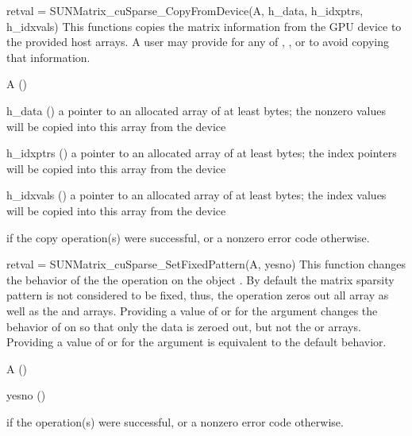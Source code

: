 {
  retval = SUNMatrix\_cuSparse\_CopyFromDevice(A, h\_data, h\_idxptrs, h\_idxvals)
}
{
  This functions copies the matrix information from the GPU device to the provided
  host arrays. A user may provide  for any of , , or
   to avoid copying that information.
}
{
  \begin{args}
  \item[A] ()
  \item[h\_data] () a pointer to an allocated array of
    at least  bytes;
    the nonzero values will be copied into this array from the device
  \item[h\_idxptrs] () a pointer to an allocated array of
    at least  bytes;
    the index pointers will be copied into this array from the device
  \item[h\_idxvals] () a pointer to an allocated array of
    at least  bytes;
    the index values will be copied into this array from the device
  \end{args}
}
{
   if the copy operation(s) were successful, or a nonzero error
  code otherwise.
}
{
}

{
  retval = SUNMatrix\_cuSparse\_SetFixedPattern(A, yesno)
}
{
  This function changes the behavior of the the  operation on
  the  object . By default the matrix sparsity pattern
  is not considered to be fixed, thus, the  operation zeros out
  all  array as well as the  and  arrays.
  Providing a value of  or  for the   argument changes
  the behavior of  on  so that only the data is zeroed out, but
  not the  or  arrays. Providing a value of 
  or  for the  argument is equivalent to the default behavior.
}
{
  \begin{args}
  \item[A] ()
  \item[yesno] ()
  \end{args}
}
{
   if the operation(s) were successful, or a nonzero error
  code otherwise.
}
{
}

